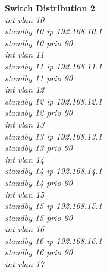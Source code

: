 \documentclass[a4paper, 12pt]{article}
\begin{document}
\hspace*{2cm}\textbf{Switch Distribution 2}\\
\hspace*{2cm}\textit{int vlan 10\\
\hspace*{2cm}standby 10 ip 192.168.10.1\\
\hspace*{2cm}standby 10 prio 90\\
\hspace*{2cm}int vlan 11\\
\hspace*{2cm}standby 11 ip 192.168.11.1\\
\hspace*{2cm}standby 11 prio 90\\
\hspace*{2cm}int vlan 12\\
\hspace*{2cm}standby 12 ip 192.168.12.1\\
\hspace*{2cm}standby 12 prio 90\\
\hspace*{2cm}int vlan 13\\
\hspace*{2cm}standby 13 ip 192.168.13.1\\
\hspace*{2cm}standby 13 prio 90\\
\hspace*{2cm}int vlan 14\\
\hspace*{2cm}standby 14 ip 192.168.14.1\\
\hspace*{2cm}standby 14 prio 90\\
\hspace*{2cm}int vlan 15\\
\hspace*{2cm}standby 15 ip 192.168.15.1\\
\hspace*{2cm}standby 15 prio 90\\
\hspace*{2cm}int vlan 16\\
\hspace*{2cm}standby 16 ip 192.168.16.1\\
\hspace*{2cm}standby 16 prio 90\\
\hspace*{2cm}int vlan 17\\
}
\end{document}
